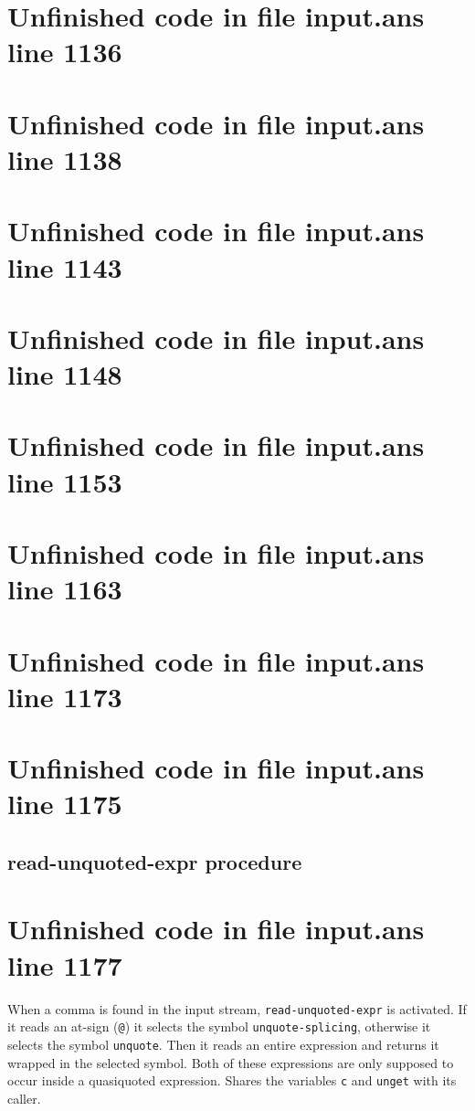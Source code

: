 \documentclass[twoside,9pt]{report}
\begin{document}
\section{Unfinished code in file input.ans line 1136}
\section{Unfinished code in file input.ans line 1138}
\section{Unfinished code in file input.ans line 1143}
\section{Unfinished code in file input.ans line 1148}
\section{Unfinished code in file input.ans line 1153}
\section{Unfinished code in file input.ans line 1163}
\section{Unfinished code in file input.ans line 1173}
\section{Unfinished code in file input.ans line 1175}
\subsection{read-unquoted-expr procedure}
\label{read-unquoted-expr-procedure}
\section{Unfinished code in file input.ans line 1177}


When a comma is found in the input stream, \texttt{read-unquoted-expr} is activated. If it reads an at-sign (\texttt{@}) it selects the symbol \texttt{unquote-splicing}, otherwise it selects the symbol \texttt{unquote}. Then it reads an entire expression and returns it wrapped in the selected symbol. Both of these expressions are only supposed to occur inside a quasiquoted expression. Shares the variables \texttt{c} and \texttt{unget} with its caller.
\end{document}
